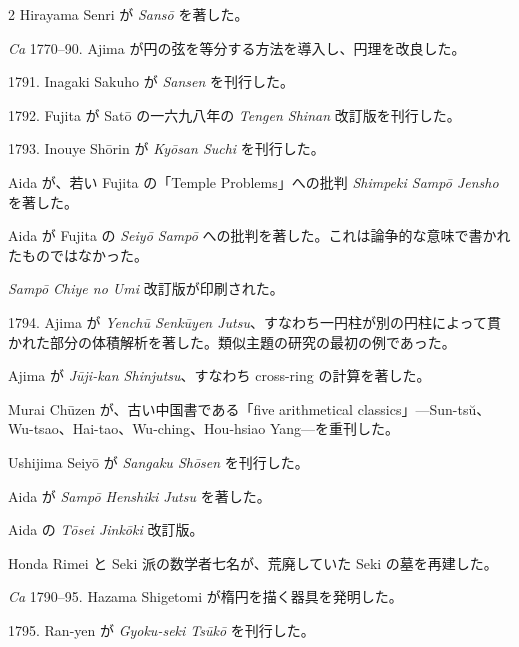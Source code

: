 \documentclass[11pt]{article}
\newcommand{\scanfooter}{}
\begin{document}
\begin{multicols}{2}
Hirayama Senri が \emph{Sansō} を著した。

\emph{Ca} 1770--90. Ajima が円の弦を等分する方法を導入し、円理を改良した。

1791. Inagaki Sakuho が \emph{Sansen} を刊行した。

1792. Fujita が Satō の一六九八年の \emph{Tengen Shinan} 改訂版を刊行した。

1793. Inouye Shōrin が \emph{Kyōsan Suchi} を刊行した。

Aida が、若い Fujita の「Temple Problems」への批判 \emph{Shimpeki Sampō Jensho} を著した。

Aida が Fujita の \emph{Seiyō Sampō} への批判を著した。これは論争的な意味で書かれたものではなかった。

\emph{Sampō Chiye no Umi} 改訂版が印刷された。

1794. Ajima が \emph{Yenchū Senkūyen Jutsu}、すなわち一円柱が別の円柱によって貫かれた部分の体積解析を著した。類似主題の研究の最初の例であった。

Ajima が \emph{Jūji-kan Shinjutsu}、すなわち cross-ring の計算を著した。

Murai Chūzen が、古い中国書である「five arithmetical classics」---Sun-tsŭ、Wu-tsao、Hai-tao、Wu-ching、Hou-hsiao Yang---を重刊した。

Ushijima Seiyō が \emph{Sangaku Shōsen} を刊行した。

Aida が \emph{Sampō Henshiki Jutsu} を著した。

Aida の \emph{Tōsei Jinkōki} 改訂版。

Honda Rimei と Seki 派の数学者七名が、荒廃していた Seki の墓を再建した。

\emph{Ca} 1790--95. Hazama Shigetomi が楕円を描く器具を発明した。

1795. Ran-yen が \emph{Gyoku-seki Tsūkō} を刊行した。
\end{multicols}
\scanfooter
\end{document}
